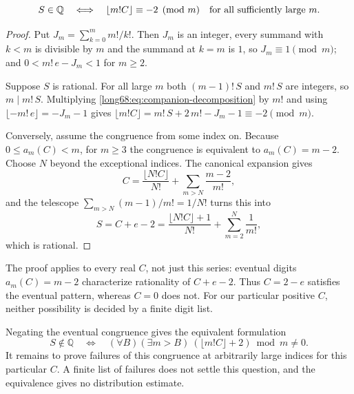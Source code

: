 \documentclass[11pt]{article}
\newcommand{\Ser}{S}
\begin{document}
\label{long68:res:lead-companion-orbit}
\begin{proposition}\label{long68:res:companion-orbit}
\[
 \Ser\in\Q
 \quad\Longleftrightarrow\quad
 \lfloor m!C\rfloor\equiv-2\pmod m
 \quad\hbox{for all sufficiently large }m.
\]
\end{proposition}

\begin{proof}
Put $J_m=\sum_{k=0}^{m}m!/k!$.  Then $J_m$ is an integer, every summand with
$k<m$ is divisible by $m$ and the summand at $k=m$ is $1$, so
$J_m\equiv1\pmod m$; and $0<m!\,e-J_m<1$ for $m\ge2$.

Suppose $\Ser$ is rational.  For all large $m$ both $(m-1)!\,\Ser$ and
$m!\,\Ser$ are integers, so $m\mid m!\,\Ser$.  Multiplying
\eqref{long68:eq:companion-decomposition} by $m!$ and using
$\lfloor -m!\,e\rfloor=-J_m-1$ gives
$\lfloor m!C\rfloor=m!\,\Ser+2\,m!-J_m-1\equiv-2\pmod m$.

Conversely, assume the congruence from some index on.  Because
$0\le a_m(C)<m$, for $m\ge3$ the congruence is equivalent to $a_m(C)=m-2$.
Choose $N$ beyond the exceptional indices.  The canonical expansion gives
\[
 C=\frac{\lfloor N!C\rfloor}{N!}+\sum_{m>N}\frac{m-2}{m!},
\]
and the telescope $\sum_{m>N}(m-1)/m!=1/N!$ turns this into
\[
 \Ser=C+e-2
 =\frac{\lfloor N!C\rfloor+1}{N!}+\sum_{m=2}^{N}\frac1{m!},
\]
which is rational.
\end{proof}

The proof applies to every real $C$, not just this series: eventual
digits $a_m(C)=m-2$ characterize rationality of $C+e-2$. Thus $C=2-e$
satisfies the eventual pattern, whereas $C=0$ does not. For our
particular positive $C$, neither possibility is decided by a finite
digit list.

Negating the eventual congruence gives the equivalent formulation
\begin{equation}
 S\notin\mathbb Q\quad\Longleftrightarrow\quad
 (\forall B)(\exists m>B)\ (\lfloor m!C\rfloor+2)\bmod m\ne0.
 \label{long68:eq:companion-cofinal}
\end{equation}
It remains to prove failures of this congruence at arbitrarily large
indices for this particular $C$. A finite list of failures does not
settle this question, and the equivalence gives no distribution estimate.
\end{document}
